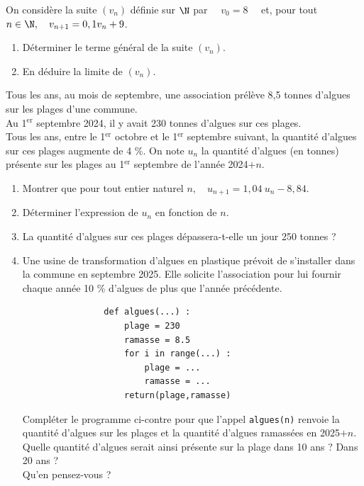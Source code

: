 \documentclass[a4paper,11pt,exos]{nsi} %
\begin{document}
\exo{}
On considère la suite $(v_n)$ définie sur $\N$ par $\quad v_0=8\quad$ et, pour tout $n\in\N, \quad v_{n+1}=0,1v_n+9$.
\begin{enumerate}
    \item Déterminer le terme général de la suite $(v_n)$.
    \item En déduire la limite de $(v_n)$.
\end{enumerate}

\exo{ \faPython \hspace*{.3cm}}
Tous les ans, au mois de septembre, une association prélève 8,5 tonnes d'algues sur les plages d'une commune.\\
Au 1$^{\text{er}}$ septembre 2024, il y avait 230 tonnes d'algues sur ces plages.\\
Tous les ans, entre le 1$^{\text{er}}$ octobre et le 1$^{\text{er}}$ septembre suivant, la quantité d'algues sur ces plages augmente de 4 \%. On note $u_n$ la quantité d'algues (en tonnes) présente sur les plages au 1$^{\text{er}}$ septembre de l'année 2024$+n$.
\begin{enumerate}
    \item Montrer que pour tout entier naturel $n, \quad u_{n+1}=1,04\ u_n-8,84$.
    \item Déterminer l'expression de $u_n$ en fonction de $n$.
    \item La quantité d'algues sur ces plages dépassera-t-elle un jour 250 tonnes ?
    \item Une usine de transformation d'algues en plastique prévoit de s'installer dans la commune en septembre 2025. Elle solicite l'association pour lui fournir chaque année 10 \% d'algues de plus que l'année précédente.\\
    \begin{minipage}{8cm}
        \begin{pyc}
            \begin{verbatim}
                def algues(...) :
                    plage = 230
                    ramasse = 8.5
                    for i in range(...) :
                        plage = ...
                        ramasse = ...
                    return(plage,ramasse)
            \end{verbatim}
        \end{pyc}
    \end{minipage}
    \begin{minipage}{8cm}
        Compléter le programme ci-contre pour que l'appel \texttt{algues(n)} renvoie la quantité d'algues sur les plages et la quantité d'algues ramassées en 2025$+n$.\\

        Quelle quantité d'algues serait ainsi présente sur la plage dans 10 ans ? Dans 20 ans ?\\
        Qu'en pensez-vous ?
    \end{minipage}
\end{enumerate}
\end{document}
